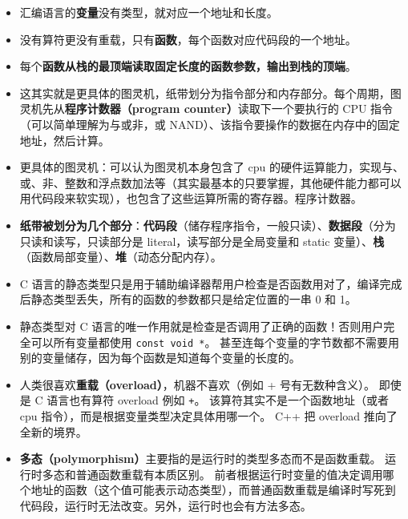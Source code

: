 \begin{itemize}
\item 汇编语言的\textbf{变量}没有类型，就对应一个地址和长度。
\item 没有算符更没有重载，只有\textbf{函数}，每个函数对应代码段的一个地址。
\item 每个\textbf{函数从栈的最顶端读取固定长度的函数参数，输出到栈的顶端}。
\item 这其实就是更具体的图灵机，纸带划分为指令部分和内存部分。每个周期，图灵机先从\textbf{程序计数器（program counter）}读取下一个要执行的 CPU 指令（可以简单理解为与或非，或 NAND）、该指令要操作的数据在内存中的固定地址，然后计算。
\item 更具体的图灵机：可以认为图灵机本身包含了 cpu 的硬件运算能力，实现与、或、非、整数和浮点数加法等（其实最基本的只要掌握，其他硬件能力都可以用代码段来软实现），也包含了这些运算所需的寄存器。程序计数器。
\item \textbf{纸带被划分为几个部分}：\textbf{代码段}（储存程序指令，一般只读）、\textbf{数据段}（分为只读和读写，只读部分是 literal，读写部分是全局变量和 static 变量）、\textbf{栈}（函数局部变量）、\textbf{堆}（动态分配内存）。
\item C 语言的静态类型只是用于辅助编译器帮用户检查是否函数用对了，编译完成后静态类型丢失，所有的函数的参数都只是给定位置的一串 0 和 1。
\item 静态类型对 C 语言的唯一作用就是检查是否调用了正确的函数！否则用户完全可以所有变量都使用 \verb`const void *`。 甚至连每个变量的字节数都不需要用别的变量储存，因为每个函数是知道每个变量的长度的。
\item 人类很喜欢\textbf{重载（overload）}，机器不喜欢（例如 + 号有无数种含义）。 即使是 C 语言也有算符 overload 例如 \verb`+`。 该算符其实不是一个函数地址（或者 cpu 指令），而是根据变量类型决定具体用哪一个。 C++ 把 overload 推向了全新的境界。
\item \textbf{多态（polymorphism）}主要指的是运行时的类型多态而不是函数重载。 运行时多态和普通函数重载有本质区别。 前者根据运行时变量的值决定调用哪个地址的函数（这个值可能表示动态类型），而普通函数重载是编译时写死到代码段，运行时无法改变。另外，运行时也会有方法多态。
\end{itemize}
